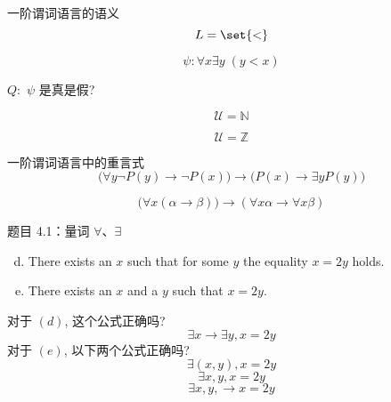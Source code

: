 \begin{frame}{一阶谓词语言的语义}
  \[
    L = \set{<}
  \]

  \[
    \psi: \forall x \exists y \; (y < x)
  \]

  \vspace{0.30cm}
  \centerline{$Q:$ $\psi$ 是真是假?}

  \vspace{0.50cm}
  \pause
  \[
    \mathcal{U} = \mathbb{N}
  \]

  \[
    \mathcal{U} = \mathbb{Z}
  \]
\end{frame}

\begin{frame}{一阶谓词语言中的重言式}
  \[
    \Big(\forall y \lnot P(y) \to \lnot P(x)\Big) \to \Big(P(x) \to \exists y P(y)\Big)
  \]

  \[
    \Big(\forall x (\alpha \to \beta)\Big) \to (\forall x \alpha \to \forall x \beta)
  \]
\end{frame}


\begin{frame}{}
  \begin{exampleblock}{题目 4.1：量词 $\forall$、$\exists$}
    \begin{enumerate}[(a)]
      \setcounter{enumi}{3}
      \item There exists an $x$ such that for some $y$ the equality $x = 2y$ holds.
      \item There exists an $x$ and a $y$ such that $x = 2y$.
    \end{enumerate}
  \end{exampleblock}

  \vspace{0.60cm}
  \pause
  对于 $(d)$, 这个公式正确吗?
  \[
    \exists x \to \exists y, x = 2y
  \]
  \pause
  对于 $(e)$, 以下两个公式正确吗?
  \[
    \exists (x,y), x = 2y
  \]
  \vspace{-0.30cm}
  \[
    \exists x, y, x = 2y
  \]
  \vspace{-0.30cm}
  \[
    \exists x, y, \to x = 2y
  \]
\end{frame}

